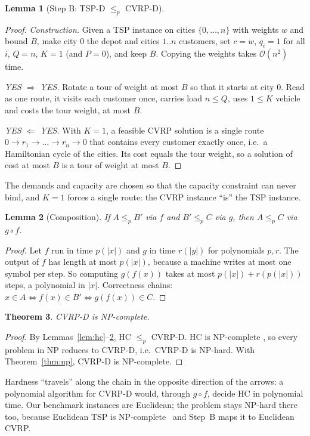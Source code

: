 \documentclass[11pt,a4paper]{article}
\newtheorem{theorem}{Theorem}
\newtheorem{lemma}[theorem]{Lemma}
\theoremstyle{definition}
\theoremstyle{remark}
\newcommand{\Ocal}{\mathcal{O}}
\begin{document}
\begin{lemma}[Step B: TSP-D $\le_p$ CVRP-D]\label{lem:tsp}
\end{lemma}
\begin{proof}
\emph{Construction.} Given a TSP instance on cities $\{0,\dots,n\}$ with weights $w$ and
bound $B$, make city $0$ the depot and cities $1..n$ customers, set $c=w$, $q_i=1$ for all
$i$, $Q=n$, $K=1$ (and $P=0$), and keep $B$. Copying the weights takes $\Ocal(n^2)$ time.

\emph{YES $\Rightarrow$ YES.} Rotate a tour of weight at most $B$ so that it starts at
city 0. Read as one route, it visits each customer once, carries load $n\le Q$, uses
$1\le K$ vehicle and costs the tour weight, at most $B$.

\emph{YES $\Leftarrow$ YES.} With $K=1$, a feasible CVRP solution is a single route
$0\to r_1\to\dots\to r_n\to 0$ that contains every customer exactly once, i.e.\ a
Hamiltonian cycle of the cities. Its cost equals the tour weight, so a solution of cost at
most $B$ is a tour of weight at most $B$.
\end{proof}
The demands and capacity are chosen so that the capacity constraint can never bind, and
$K=1$ forces a single route: the CVRP instance ``is'' the TSP instance.

\begin{lemma}[Composition]\label{lem:comp}
If $A\le_p B'$ via $f$ and $B'\le_p C$ via $g$, then $A\le_p C$ via $g\circ f$.
\end{lemma}
\begin{proof}
Let $f$ run in time $p(|x|)$ and $g$ in time $r(|y|)$ for polynomials $p,r$. The output of
$f$ has length at most $p(|x|)$, because a machine writes at most one symbol per step. So
computing $g(f(x))$ takes at most $p(|x|) + r(p(|x|))$ steps, a polynomial in $|x|$.
Correctness chains: $x\in A \iff f(x)\in B' \iff g(f(x))\in C$.
\end{proof}

\begin{theorem}\label{thm:npc}
CVRP-D is NP-complete.
\end{theorem}
\begin{proof}
By Lemmas~\ref{lem:hc}--\ref{lem:comp}, HC $\le_p$ CVRP-D. HC is NP-complete
\cite{karp1972}, so every problem in NP reduces to CVRP-D, i.e.\ CVRP-D is NP-hard. With
Theorem~\ref{thm:np}, CVRP-D is NP-complete.
\end{proof}
Hardness ``travels'' along the chain in the opposite direction of the arrows: a polynomial
algorithm for CVRP-D would, through $g\circ f$, decide HC in polynomial time. Our benchmark
instances are Euclidean; the problem stays NP-hard there too, because Euclidean TSP is
NP-complete~\cite{papadimitriou1977,garey1976} and Step~B maps it to Euclidean CVRP.
\end{document}
